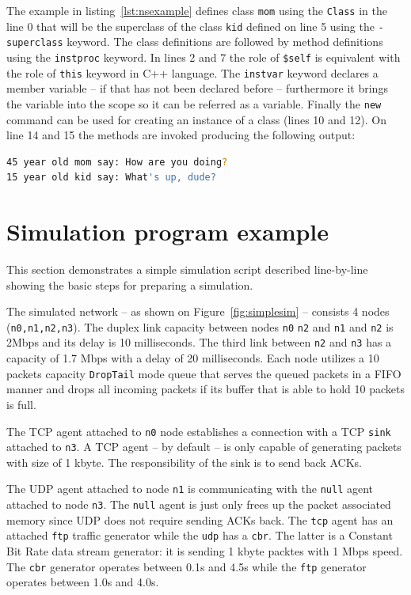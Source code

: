 \documentclass[a4paper]{article}
\begin{document}
The example in listing~\ref{lst:nsexample} defines class \verb!mom! using the \verb!Class! in the line 0 that will be the superclass of the class \verb!kid! defined on line 5 using the \verb!-superclass! keyword. The class definitions are followed by method definitions using the \verb!instproc! keyword. In lines 2 and 7 the role of \verb!$self! is equivalent with the role of \verb!this! keyword in C++ language. The \verb!instvar! keyword declares a member variable -- if that has not been declared before -- furthermore it brings the variable into the scope so it can be referred as a variable. Finally the \verb!new! command can be used for creating an instance of a class (lines 10 and 12). On line 14 and 15 the methods are invoked producing the following output:
\begin{lstlisting}[language=bash]
45 year old mom say: How are you doing?
15 year old kid say: What's up, dude?
\end{lstlisting}


\section{Simulation program example}

This section demonstrates a simple simulation script described line-by-line showing the basic steps for preparing a simulation.

The simulated network -- as shown on Figure~\ref{fig:simplesim} -- consists 4 nodes (\verb!n0,n1,n2,n3!). The duplex link capacity between nodes \verb!n0! \verb!n2! and \verb!n1! and \verb!n2! is 2Mbps and its delay is 10 milliseconds. The third link between \verb!n2! and \verb!n3! has a capacity of 1.7 Mbps with a delay of 20 milliseconds. Each node utilizes a 10 packets capacity \verb!DropTail! mode queue that serves the queued packets in a FIFO manner and drops all incoming packets if its buffer that is able to hold 10 packets is full.

The TCP agent attached to \verb!n0! node establishes a connection with a TCP \verb!sink! attached to \verb!n3!. A TCP agent -- by default -- is only capable of generating packets with size of 1 kbyte. The responsibility of the sink is to send back ACKs.

The UDP agent attached to node \verb!n1! is communicating with the \verb!null! agent attached to node \verb!n3!. The \verb!null! agent is just only frees up the packet associated memory since UDP does not require sending ACKs back. The \verb!tcp! agent has an attached \verb!ftp! traffic generator while the \verb!udp! has a \verb!cbr!. The latter is a Constant Bit Rate data stream generator: it is sending 1 kbyte packtes with 1 Mbps speed. The \verb!cbr! generator operates between 0.1s and 4.5s while the \verb!ftp! generator operates between 1.0s and 4.0s.
\end{document}
